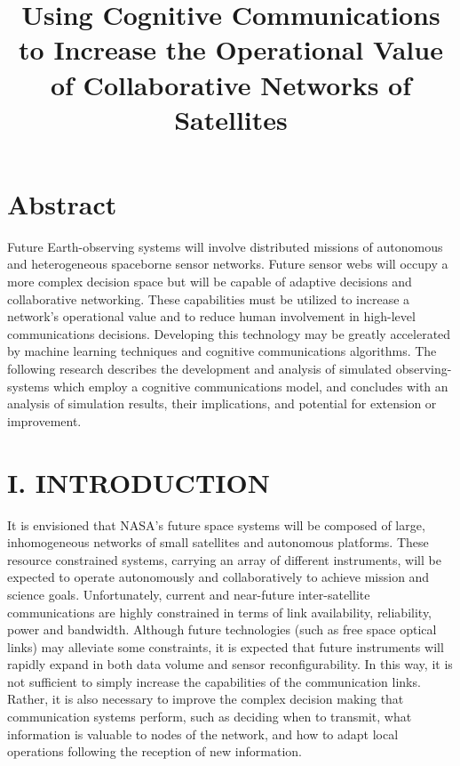 \documentclass[11pt]{article}
\date{}
\title{Using Cognitive Communications to Increase the Operational Value of Collaborative Networks of Satellites}
\begin{document}
\maketitle
\section*{Abstract}
\label{sec:org2b0cc2c}


Future Earth-observing systems will involve distributed missions of autonomous
and heterogeneous spaceborne sensor networks.  Future sensor webs will occupy a
more complex decision space but will be capable of adaptive decisions and
collaborative networking.  These capabilities must be utilized to increase a
network's operational value and to reduce human involvement in high-level
communications decisions.  Developing this technology may be greatly accelerated
by machine learning techniques and cognitive communications algorithms.  The
following research describes the development and analysis of simulated
observing-systems which employ a cognitive communications model, and concludes
with an analysis of simulation results, their implications, and potential for
extension or improvement.

\section*{I. INTRODUCTION}
\label{sec:orgd539189}

It is envisioned that NASA's future space systems will be composed of large,
inhomogeneous networks of small satellites and autonomous platforms.  These
resource constrained systems, carrying an array of different instruments, will
be expected to operate autonomously and collaboratively to achieve mission and
science goals.  Unfortunately, current and near-future inter-satellite
communications are highly constrained in terms of link availability,
reliability, power and bandwidth.  Although future technologies (such as free
space optical links) may alleviate some constraints, it is expected that future
instruments will rapidly expand in both data volume and sensor
reconfigurability.  In this way, it is not sufficient to simply increase the
capabilities of the communication links.  Rather, it is also necessary to
improve the complex decision making that communication systems perform, such as
deciding when to transmit, what information is valuable to nodes of the network,
and how to adapt local operations following the reception of new information.
\end{document}
